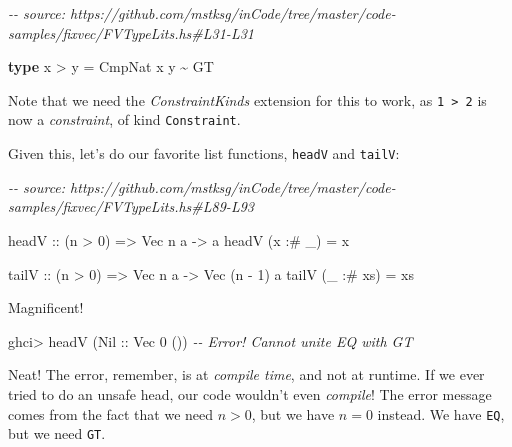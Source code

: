 \documentclass[]{article}
\newenvironment{Shaded}{}{}
\newcommand{\CommentTok}[1]{\textcolor[rgb]{0.38,0.63,0.69}{\textit{#1}}}
\newcommand{\DataTypeTok}[1]{\textcolor[rgb]{0.56,0.13,0.00}{#1}}
\newcommand{\DecValTok}[1]{\textcolor[rgb]{0.25,0.63,0.44}{#1}}
\newcommand{\KeywordTok}[1]{\textcolor[rgb]{0.00,0.44,0.13}{\textbf{#1}}}
\newcommand{\NormalTok}[1]{#1}
\newcommand{\OperatorTok}[1]{\textcolor[rgb]{0.40,0.40,0.40}{#1}}
\newcommand{\OtherTok}[1]{\textcolor[rgb]{0.00,0.44,0.13}{#1}}
\begin{document}
\begin{Shaded}
\begin{Highlighting}[]
\CommentTok{{-}{-} source: https://github.com/mstksg/inCode/tree/master/code{-}samples/fixvec/FVTypeLits.hs\#L31{-}L31}

\KeywordTok{type}\NormalTok{ x }\OperatorTok{>}\NormalTok{ y }\OtherTok{=} \DataTypeTok{CmpNat}\NormalTok{ x y }\OperatorTok{\textasciitilde{}} \DataTypeTok{\textquotesingle{}GT}
\end{Highlighting}
\end{Shaded}

Note that we need the \emph{ConstraintKinds} extension for this to work, as
\texttt{1\ \textgreater{}\ 2} is now a \emph{constraint}, of kind
\texttt{Constraint}.

Given this, let's do our favorite list functions, \texttt{headV} and
\texttt{tailV}:

\begin{Shaded}
\begin{Highlighting}[]
\CommentTok{{-}{-} source: https://github.com/mstksg/inCode/tree/master/code{-}samples/fixvec/FVTypeLits.hs\#L89{-}L93}

\OtherTok{headV ::}\NormalTok{ (n }\OperatorTok{>} \DecValTok{0}\NormalTok{) }\OtherTok{=>} \DataTypeTok{Vec}\NormalTok{ n a }\OtherTok{{-}>}\NormalTok{ a}
\NormalTok{headV (x }\OperatorTok{:\#}\NormalTok{ \_)  }\OtherTok{=}\NormalTok{ x}

\OtherTok{tailV ::}\NormalTok{ (n }\OperatorTok{>} \DecValTok{0}\NormalTok{) }\OtherTok{=>} \DataTypeTok{Vec}\NormalTok{ n a }\OtherTok{{-}>} \DataTypeTok{Vec}\NormalTok{ (n }\OperatorTok{{-}} \DecValTok{1}\NormalTok{) a}
\NormalTok{tailV (\_ }\OperatorTok{:\#}\NormalTok{ xs) }\OtherTok{=}\NormalTok{ xs}
\end{Highlighting}
\end{Shaded}

Magnificent!

\begin{Shaded}
\begin{Highlighting}[]
\NormalTok{ghci}\OperatorTok{>}\NormalTok{ headV (}\DataTypeTok{Nil}\OtherTok{ ::} \DataTypeTok{Vec} \DecValTok{0}\NormalTok{ ())}
\CommentTok{{-}{-} Error!  Cannot unite \textquotesingle{}EQ with \textquotesingle{}GT}
\end{Highlighting}
\end{Shaded}

Neat! The error, remember, is at \emph{compile time}, and not at runtime. If we
ever tried to do an unsafe head, our code wouldn't even \emph{compile}! The
error message comes from the fact that we need \(n > 0\), but we have \(n = 0\)
instead. We have \texttt{EQ}, but we need \texttt{GT}.
\end{document}
